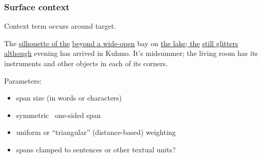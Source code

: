\documentclass[t]{beamer} %
\begin{document}
\begin{frame}
  \frametitle{Surface context}
  
  \begin{center}
    Context term occurs  around target.
  \end{center}

  The {\color{secondary}\uline{silhouette of the}} 
  {\color{secondary}\uline{beyond a wide-open}} bay on {\color{secondary}\uline{the lake;
    the}}  {\color{secondary}\uline{still glitters although}} evening
  has arrived in Kuhmo. It's midsummer; the living room has its
  instruments and other objects in each of its corners. $\quad$ \primary{[L3/R3 span, $k = 6$]}
  
  \gap
  Parameters:
  \begin{itemize}
  \item span size (in words or characters)
  \item symmetric \vs\ one-sided span
  \item uniform or ``triangular'' (distance-based) weighting
  \item spans clamped to sentences or other textual units?
  \end{itemize}
\end{frame}
\end{document}
